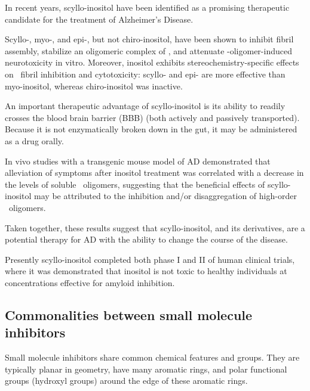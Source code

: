 In recent years, scyllo-inositol have been identified as a promising therapeutic candidate for the treatment of Alzheimer's Disease.

Scyllo-, myo-, and epi-, but not chiro-inositol, have been shown to inhibit  fibril assembly, stabilize an oligomeric complex of , and attenuate \abeta-oligomer-induced neurotoxicity in vitro. Moreover, inositol exhibits stereochemistry-specific effects on \abeta\  fibril inhibition and cytotoxicity: scyllo- and epi- are more effective than myo-inositol, whereas chiro-inositol was inactive.\cite{McLaurin:2000bq}

An important therapeutic advantage of scyllo-inositol is its ability to readily crosses the bloodbrain barrier (BBB) (both actively and passively transported). Because it is not enzymatically broken down in the gut, it may be administered as a drug orally. 
		
In vivo studies with a transgenic mouse model of AD demonstrated that alleviation of symptoms after inositol treatment was correlated with a decrease in the levels of soluble \abeta\ oligomers, suggesting that the beneficial effects of scyllo-inositol may be attributed to the inhibition and/or disaggregation of high-order \abeta\ oligomers.\cite{McLaurin:2006eb}

Taken together, these results suggest that scyllo-inositol, and its derivatives, are a potential therapy for AD with the ability to change the course of the disease.\cite{Nitz:2008jl,Sun:2008ko}

Presently scyllo-inositol completed both phase I and II of human clinical trials, where it was demonstrated that inositol is not toxic to healthy individuals at concentrations effective for amyloid inhibition.

\subsection{Commonalities between small molecule inhibitors}
Small molecule inhibitors share common chemical features and groups.  They are typically planar in geometry, have many aromatic rings, and polar functional groups (hydroxyl groups) around the edge of these aromatic rings.

